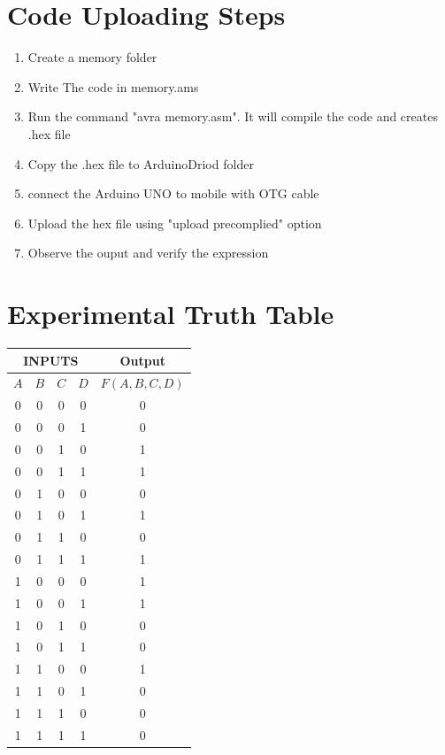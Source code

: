 \documentclass[a4paper,12pt]{article}
\begin{document}
\section*{Code Uploading Steps}
\begin{enumerate}
        \item Create a memory folder
        \item Write The code in memory.ams
        \item Run the command "avra memory.asm". It will compile the code and creates .hex file
        \item Copy the .hex file to ArduinoDriod folder
        \item connect the Arduino UNO to mobile with OTG cable
        \item Upload the hex file using "upload precomplied" option
        \item Observe the ouput and verify the expression
\end{enumerate}
\section*{Experimental Truth Table}
\begin{center}
\begin{tabular}{|c|c|c|c|c|}
\hline
\multicolumn{4}{|c|}{\textbf{INPUTS}} & \textbf{Output} \\
\hline
$A$ & $B$ & $C$ & $D$ & $F(A,B,C,D)$ \\
\hline
0 & 0 & 0 & 0 & 0 \\ 
0 & 0 & 0 & 1 & 0 \\ 
0 & 0 & 1 & 0 & 1 \\ 
0 & 0 & 1 & 1 & 1 \\ 
0 & 1 & 0 & 0 & 0 \\ 
0 & 1 & 0 & 1 & 1 \\ 
0 & 1 & 1 & 0 & 0 \\ 
0 & 1 & 1 & 1 & 1 \\ 
1 & 0 & 0 & 0 & 1 \\ 
1 & 0 & 0 & 1 & 1 \\ 
1 & 0 & 1 & 0 & 0 \\ 
1 & 0 & 1 & 1 & 0 \\ 
1 & 1 & 0 & 0 & 1 \\ 
1 & 1 & 0 & 1 & 0 \\ 
1 & 1 & 1 & 0 & 0 \\ 
1 & 1 & 1 & 1 & 0 \\ 
\hline
\end{tabular}
\end{center}
\end{document}

